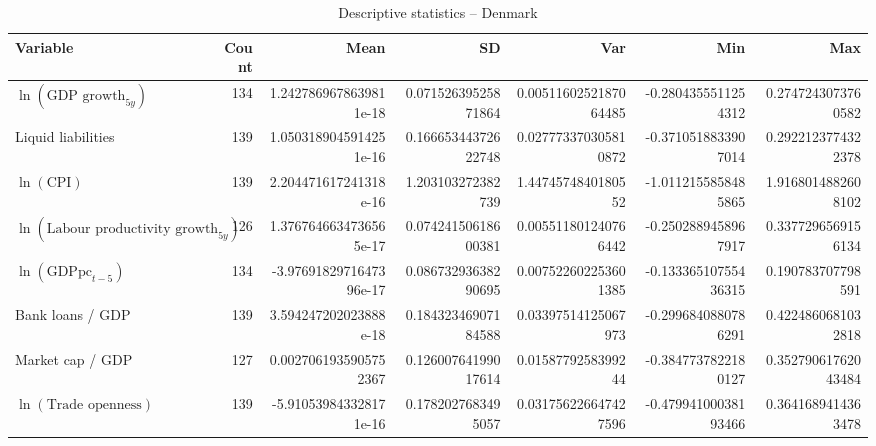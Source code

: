 \begin{table}[!htbp]
\centering
\caption{Descriptive statistics -- Denmark}
\footnotesize
\begin{tabular}{lrrrrrr}
\toprule
Variable & Count & Mean & SD & Var & Min & Max \\
\midrule
$\ln(\text{GDP growth}_{5y})$ & 134 & 1.2427869678639811e-18 & 0.07152639525871864 & 0.0051160252187064485 & -0.2804355511254312 & 0.2747243073760582 \\
Liquid liabilities & 139 & 1.0503189045914251e-16 & 0.16665344372622748 & 0.027773370305810872 & -0.3710518833907014 & 0.2922123774322378 \\
$\ln(\text{CPI})$ & 139 & 2.204471617241318e-16 & 1.203103272382739 & 1.4474574840180552 & -1.0112155858485865 & 1.9168014882608102 \\
$\ln(\text{Labour productivity growth}_{5y})$ & 126 & 1.3767646634736565e-17 & 0.07424150618600381 & 0.005511801240766442 & -0.2502889458967917 & 0.3377296569156134 \\
$\ln(\text{GDPpc}_{t-5})$ & 134 & -3.9769182971647396e-17 & 0.08673293638290695 & 0.007522602253601385 & -0.13336510755436315 & 0.190783707798591 \\
Bank loans / GDP & 139 & 3.594247202023888e-18 & 0.18432346907184588 & 0.03397514125067973 & -0.2996840880786291 & 0.4224860681032818 \\
Market cap / GDP & 127 & 0.0027061935905752367 & 0.12600764199017614 & 0.0158779258399244 & -0.3847737822180127 & 0.35279061762043484 \\
$\ln(\text{Trade openness})$ & 139 & -5.910539843328171e-16 & 0.1782027683495057 & 0.031756226647427596 & -0.47994100038193466 & 0.3641689414363478 \\
\bottomrule
\end{tabular}
\end{table}


